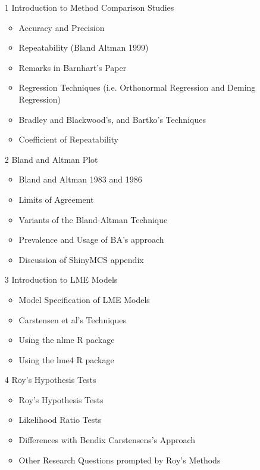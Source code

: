 \documentclass{report}
\begin{document}
\tableofcontents
\newpage
\begin{itemize}		
	
	\item[1]	Introduction to Method Comparison Studies	
	\begin{itemize}	
		\item	Accuracy and Precision
		\item	Repeatability (Bland Altman 1999)
		\item	Remarks in Barnhart's Paper
		\item	Regression Techniques (i.e. Orthonormal Regression and Deming Regression)
		\item   Bradley and Blackwood's, and Bartko's Techniques
	    \item   Coefficient of Repeatability
	\end{itemize}	
	
	
	\item[2]	Bland and Altman Plot	
	\begin{itemize}	
		\item	Bland and Altman 1983 and 1986
		\item	Limits of Agreement
		\item	Variants of the Bland-Altman Technique
		\item   Prevalence and Usage of BA's approach
		\item   Discussion of ShinyMCS appendix
	\end{itemize}
	
	\item[3]	Introduction to LME Models	
	\begin{itemize}	
		\item	Model Specification of LME Models
		\item	Carstensen et al's Techniques
		\item	Using the nlme R package
		\item   Using the lme4 R package
	\end{itemize}
	
	
	\item[4]	Roy's Hypothesis Tests	
	\begin{itemize}	
		\item	Roy's Hypothesis Tests
	    \item   Likelihood Ratio Tests
		\item	Differences with Bendix Carstensens's Approach
		\item	Other Research Questions prompted by Roy's Methods
	\end{itemize}		
	

\end{itemize}
\end{document}

